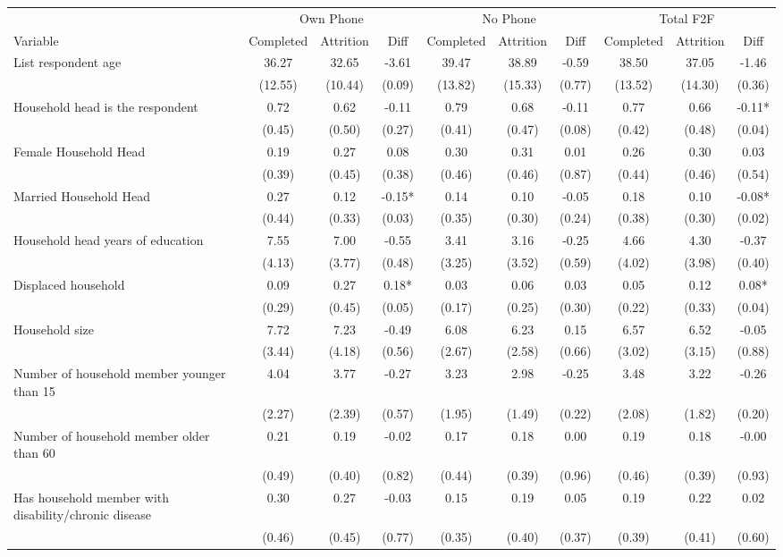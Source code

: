 \begin{tabular}{l*{9}c}
\hline\hline
 & \multicolumn{3}{c}{Own Phone} & \multicolumn{3}{c}{No Phone} & \multicolumn{3}{c}{Total F2F}\\ 
Variable & Completed & Attrition & Diff & Completed & Attrition & Diff & Completed & Attrition & Diff \\
\hline
List respondent age&36.27&32.65&-3.61&39.47&38.89&-0.59&38.50&37.05&-1.46\\
&(12.55)&(10.44)&(0.09)&(13.82)&(15.33)&(0.77)&(13.52)&(14.30)&(0.36)\\
Household head is the respondent&0.72&0.62&-0.11&0.79&0.68&-0.11&0.77&0.66&-0.11*\\
&(0.45)&(0.50)&(0.27)&(0.41)&(0.47)&(0.08)&(0.42)&(0.48)&(0.04)\\
Female Household Head&0.19&0.27&0.08&0.30&0.31&0.01&0.26&0.30&0.03\\
&(0.39)&(0.45)&(0.38)&(0.46)&(0.46)&(0.87)&(0.44)&(0.46)&(0.54)\\
Married Household Head&0.27&0.12&-0.15*&0.14&0.10&-0.05&0.18&0.10&-0.08*\\
&(0.44)&(0.33)&(0.03)&(0.35)&(0.30)&(0.24)&(0.38)&(0.30)&(0.02)\\
Household head years of education&7.55&7.00&-0.55&3.41&3.16&-0.25&4.66&4.30&-0.37\\
&(4.13)&(3.77)&(0.48)&(3.25)&(3.52)&(0.59)&(4.02)&(3.98)&(0.40)\\
Displaced household&0.09&0.27&0.18*&0.03&0.06&0.03&0.05&0.12&0.08*\\
&(0.29)&(0.45)&(0.05)&(0.17)&(0.25)&(0.30)&(0.22)&(0.33)&(0.04)\\
Household size&7.72&7.23&-0.49&6.08&6.23&0.15&6.57&6.52&-0.05\\
&(3.44)&(4.18)&(0.56)&(2.67)&(2.58)&(0.66)&(3.02)&(3.15)&(0.88)\\
Number of household member younger than 15&4.04&3.77&-0.27&3.23&2.98&-0.25&3.48&3.22&-0.26\\
&(2.27)&(2.39)&(0.57)&(1.95)&(1.49)&(0.22)&(2.08)&(1.82)&(0.20)\\
Number of household member older than 60&0.21&0.19&-0.02&0.17&0.18&0.00&0.19&0.18&-0.00\\
&(0.49)&(0.40)&(0.82)&(0.44)&(0.39)&(0.96)&(0.46)&(0.39)&(0.93)\\
Has household member with disability/chronic disease&0.30&0.27&-0.03&0.15&0.19&0.05&0.19&0.22&0.02\\
&(0.46)&(0.45)&(0.77)&(0.35)&(0.40)&(0.37)&(0.39)&(0.41)&(0.60)\\

\end{tabular}
